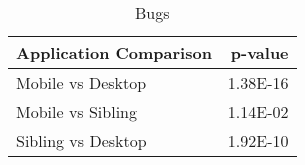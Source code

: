 \begin{table}[ht]
\centering
\caption{Bugs} 
\begin{tabular}{lr}
  \hline
Application Comparison & p-value \\ 
  \hline
Mobile vs Desktop & 1.38E-16 \\ 
  Mobile vs Sibling & 1.14E-02 \\ 
  Sibling vs Desktop & 1.92E-10 \\ 
   \hline
\end{tabular}
\label{tab:bugs}
\end{table}
